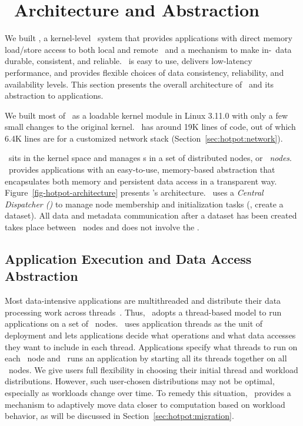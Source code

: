 \section{\hotpot\ Architecture and Abstraction}
\label{sec:hotpot:design}
\label{sec:hotpot:abstraction}

We built {\em \hotpot}, a kernel-level \dsnvm\ system that %
provides applications with direct memory load/store access to both local and remote \nvm\
and a mechanism to make in-\nvm\ data durable, consistent, and reliable.
\hotpot\ is easy to use, delivers low-latency performance, 
and provides flexible choices of data consistency, reliability, and availability levels.
This section presents the overall architecture of \hotpot\ and its abstraction to applications.

We built most of \hotpot\ as a loadable kernel module in Linux 3.11.0 
with only a few small changes to the original kernel. 
\hotpot\ has around 19K lines of code, out of which 6.4K lines are for a customized network stack (Section~\ref{sec:hotpot:network}).

\hotpot\ sits in the kernel space and manages \nvm{}s in a set of distributed nodes, or {\em \hotpot\ nodes}.
\hotpot\ provides applications with an easy-to-use, memory-based abstraction that encapsulates 
both memory and persistent data access in a transparent way.
Figure~\ref{fig-hotpot-architecture} presents \hotpot's architecture.
\hotpot\ uses a {\em Central Dispatcher (\cd)} 
to manage node membership and initialization tasks (\eg, create a dataset).
All data and metadata communication after a dataset has been created takes place between \hotpot\ nodes and does not involve the \cd.



\subsection{Application Execution and Data Access Abstraction}
Most data-intensive applications are multithreaded 
and distribute their data processing work across threads~\cite{MongoDB,Gonzalez12-OSDI}.
Thus, \hotpot\ adopts a thread-based model to run applications on a set of \hotpot\ nodes.
\hotpot\ uses application threads as the unit of deployment and
lets applications decide what operations and what data accesses they want to include in each thread.
Applications specify what threads to run on each \hotpot\ node 
and \hotpot\ runs an application by starting all its threads together on all \hotpot\ nodes. 
We give users full flexibility in choosing their initial thread and workload distributions.
However, such user-chosen distributions may not be optimal, especially as workloads change over time.
To remedy this situation, 
\hotpot\ provides a mechanism to adaptively move data closer to computation based on workload behavior, 
as will be discussed in Section~\ref{sec:hotpot:migration}.


